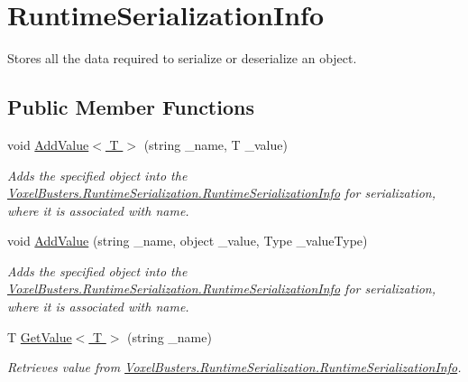 \hypertarget{class_voxel_busters_1_1_runtime_serialization_1_1_runtime_serialization_info}{}\section{Runtime\+Serialization\+Info}
\label{class_voxel_busters_1_1_runtime_serialization_1_1_runtime_serialization_info}


Stores all the data required to serialize or deserialize an object.  


\subsection*{Public Member Functions}
\begin{DoxyCompactItemize}
\item 
void \hyperlink{class_voxel_busters_1_1_runtime_serialization_1_1_runtime_serialization_info_ac0ca49c051194ccb86acf86a757a9fed}{Add\+Value$<$ T $>$} (string \+\_\+name, T \+\_\+value)
\begin{DoxyCompactList}\small\item\em Adds the specified object into the \hyperlink{class_voxel_busters_1_1_runtime_serialization_1_1_runtime_serialization_info}{Voxel\+Busters.\+Runtime\+Serialization.\+Runtime\+Serialization\+Info} for serialization, where it is associated with name. \end{DoxyCompactList}\item 
void \hyperlink{class_voxel_busters_1_1_runtime_serialization_1_1_runtime_serialization_info_a2c98842a732a81c60f927c1c93664dac}{Add\+Value} (string \+\_\+name, object \+\_\+value, Type \+\_\+value\+Type)
\begin{DoxyCompactList}\small\item\em Adds the specified object into the \hyperlink{class_voxel_busters_1_1_runtime_serialization_1_1_runtime_serialization_info}{Voxel\+Busters.\+Runtime\+Serialization.\+Runtime\+Serialization\+Info} for serialization, where it is associated with name. \end{DoxyCompactList}\item 
T \hyperlink{class_voxel_busters_1_1_runtime_serialization_1_1_runtime_serialization_info_a197deebcf58f289b38878942ec3f980c}{Get\+Value$<$ T $>$} (string \+\_\+name)
\begin{DoxyCompactList}\small\item\em Retrieves value from \hyperlink{class_voxel_busters_1_1_runtime_serialization_1_1_runtime_serialization_info}{Voxel\+Busters.\+Runtime\+Serialization.\+Runtime\+Serialization\+Info}. \end{DoxyCompactList}\item 

\end{DoxyCompactItemize}
